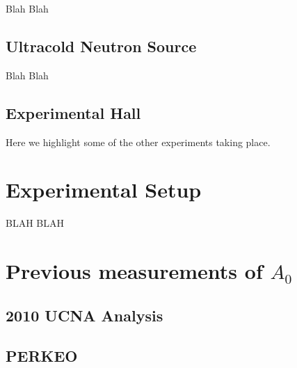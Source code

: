 Blah Blah

\subsection{Ultracold Neutron Source}

Blah Blah

\subsection{Experimental Hall}

Here we highlight some of the other experiments taking place.


\section{Experimental Setup}
\label{sec:Setup}

BLAH BLAH


\section{Previous measurements of $A_{0}$}
\label{sec:Previous_results}

\subsection{2010 UCNA Analysis}
\subsection{PERKEO}






